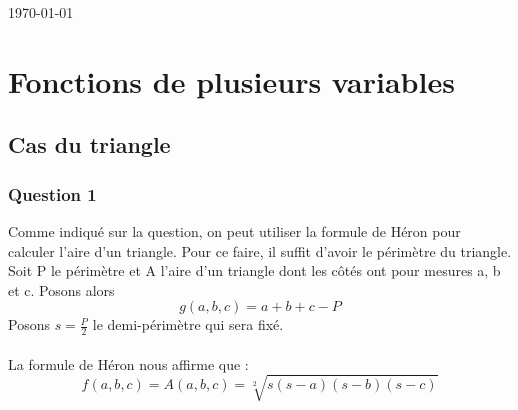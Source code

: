 \documentclass[12pt]{report}
\begin{document}
\begin{titlepage}
	
	
	\vfill\vfill\vfill %
	
	{\large\today} %
	
	
	 
	
	\vfill %
	
\end{titlepage}

\tableofcontents
\part{Fonctions de plusieurs variables}

\chapter{Cas du triangle}
\section{Question 1}
Comme indiqué sur la question, on peut utiliser la formule de Héron pour calculer l'aire d'un triangle.
Pour ce faire, il suffit d'avoir le périmètre du triangle.\\
\indent Soit P le périmètre et A l'aire d'un triangle dont les côtés ont pour mesures a, b et c. Posons alors\\
\begin{equation}
   g(a,b,c) = a + b + c - P
\end{equation}
Posons $s = \frac{P}{2}$ le demi-périmètre qui sera fixé.\\ \\
La formule de Héron nous affirme que :
\begin{equation}
   f(a,b,c) = A(a,b,c) = \sqrt[2]{s(s-a)(s-b)(s-c)}
\end{equation}
\clearpage
\end{document}
